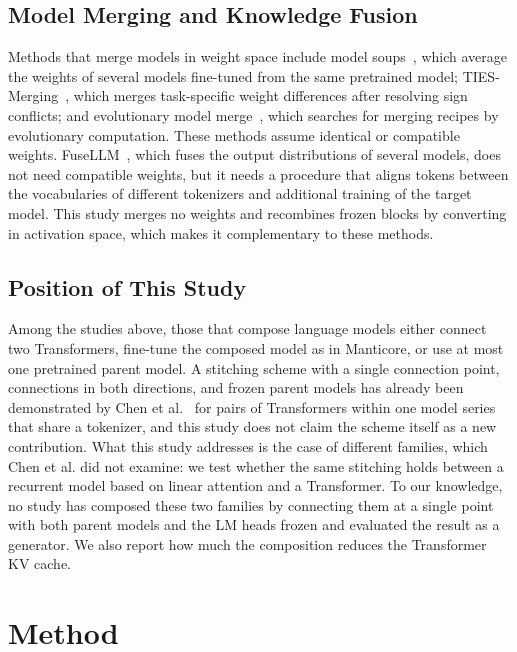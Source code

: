 \documentclass[conference]{IEEEtran}
\begin{document}
\subsection{Model Merging and Knowledge Fusion}
Methods that merge models in weight space include model soups~\cite{pmlr-v162-wortsman22a}, which average the weights of several
models fine-tuned from the same pretrained model; TIES-Merging~\cite{3666122.3666432}, which merges task-specific weight differences
after resolving sign conflicts; and evolutionary model merge~\cite{Akiba2025}, which searches for merging recipes by evolutionary
computation. These methods assume identical or compatible weights. FuseLLM~\cite{wan2024knowledge}, which fuses the output
distributions of several models, does not need compatible weights, but it needs a procedure that aligns tokens between the
vocabularies of different tokenizers and additional training of the target model. This study merges no weights and recombines
frozen blocks by converting in activation space, which makes it complementary to these methods.

\subsection{Position of This Study}
Among the studies above, those that compose language models either connect two Transformers, fine-tune the composed model as in
Manticore, or use at most one pretrained parent model. A stitching scheme with a single connection point, connections in both directions, and frozen parent
models has already been demonstrated by Chen et al.~\cite{chen2025transferring} for pairs of Transformers within one model series that share a
tokenizer, and this study does not claim the scheme itself as a new contribution. What this study addresses is the case of
different families, which Chen et al. did not examine: we test whether the same stitching holds between a recurrent model based on linear
attention and a Transformer. To our knowledge, no study has composed these two families by connecting them at a single point with both
parent models and the LM heads frozen and evaluated the result as a generator. We also report how much the composition reduces the
Transformer KV cache.

\section{Method}\label{sec:method}
\end{document}
